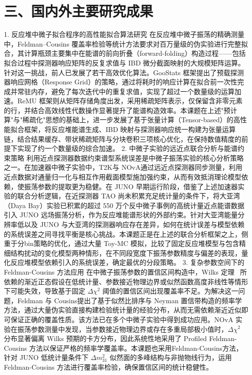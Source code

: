 
\section*{三、国内外主要研究成果}

1. 反应堆中微子拟合程序的高性能拟合算法研究
在反应堆中微子振荡的精确测量中，Feldman--Cousins 覆盖率检验等统计方法要求对百万量级的伪实验进行完整拟合，其计算瓶颈主要集中在能谱的前向折叠（forward-folding）构造过程——包括拟合过程中探测器响应矩阵的反复求值与 IBD 微分截面映射的大规模矩阵运算。针对这一挑战，前人已发展了若干高效优化算法。GooStats 框架提出了预载探测器响应网格（Response Grid）的策略，通过将耗时的响应计算在拟合前一次性完成并常驻内存，避免了每次迭代中的重复求值，实现了超过一个数量级的运算加速。ReMU 框架则从矩阵存储角度出发，采用稀疏矩阵表示，仅保留含非零元素的行，并结合高效线性代数操作显著提升了能谱构造效率。本课题在上述"预计算"与"稀疏化"思想的基础上，进一步发展了基于张量计算（Tensor-based）的高性能拟合框架，将反应堆能谱生成、IBD 映射与探测器响应统一构建为张量运算链，结合结果缓存、带状稀疏矩阵与分块卷积三项核心优化，在保持数值精度的前提下实现了约一个数量级的综合加速。
2. 中微子实验的远近点联合分析与能谱约束策略
利用近点探测器数据约束谱型系统误差是中微子振荡实验的核心分析策略之一。在加速器中微子实验中，T2K与 NOvA通过远近点探测器同步测量，利用近点数据对通量归一化与相互作用截面模型施加强约束，从而有效抵消理论模型依赖，使振荡参数的提取更为稳健。在 JUNO 早期运行阶段，借鉴了上述加速器实验的联合分析逻辑，在近探测器 TAO 尚未积累充足统计量的条件下，将大亚湾（Daya Bay）实验已积累的超过 550 万个反中微子事例的高统计量近点能谱数据引入 JUNO 远场振荡分析，作为反应堆能谱形状的外部约束。针对大亚湾能量分辨率低以及 JUNO 与大亚湾的探测器响应存在差异，如何在统计误差与模型依赖的系统误差之间寻找平衡是核心挑战。本课题正是在上述的联合分析框架之上，侧重于分bin策略的优化，通过大量 Toy-MC 模拟，比较了固定反应堆模型与包含精细结构扰动的变化模型两种情形，在不同段宽度下振荡参数精度与偏差的表现，量化反应堆模型依赖引入的系统误差，确定最优的分段策略。
3. 复杂参数空间下的 Feldman-Cousins 方法应用
在中微子振荡参数的置信区间构造中，Wilks 定理~\cite{Wilks:1938dza} 所依赖的渐近正态假设在低统计量、参数接近物理边界或似然函数高度非线性等情形下可能失效，导致基于固定 $\Delta\chi^2$ 阈值的置信区间出现覆盖率不足。为解决这一问题，Feldman 与 Cousins提出了基于似然比排序与 Neyman 置信带构造的频率学方法，通过大量伪实验直接构建检验统计量的经验分布，从而无需依赖渐近近似即可保证正确的覆盖性质。该方法已在多个中微子实验中得到成功应用。NOvA 实验在振荡参数测量中发现，当参数接近物理边界或存在多重局部极小值时，$\Delta\chi^2$ 分布显著偏离 Wilks 预期的卡方分布，因此系统性地采用了 Profiled Feldman-Cousins 方法以保证严格的频率学覆盖率。本课题也采用Feldman-Cousins方法，针对 JUNO 低统计量条件下 $\Delta m^2_{31}$ 似然面的多峰结构与非抛物线行为，运用 Feldman-Cousins 方法进行覆盖率检验，确保置信区间的统计稳健性。
